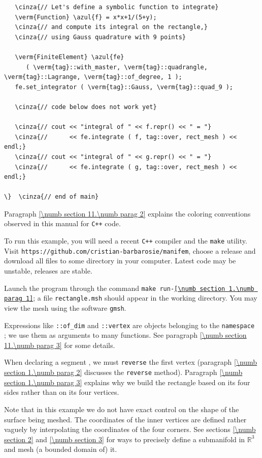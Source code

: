 \begin{Verbatim}
   \cinza{// Let's define a symbolic function to integrate}
   \verm{Function} \azul{f} = x*x+1/(5+y);
   \cinza{// and compute its integral on the rectangle,}
   \cinza{// using Gauss quadrature with 9 points}

   \verm{FiniteElement} \azul{fe}
      ( \verm{tag}::with_master, \verm{tag}::quadrangle, \verm{tag}::Lagrange, \verm{tag}::of_degree, 1 );
   fe.set_integrator ( \verm{tag}::Gauss, \verm{tag}::quad_9 );

   \cinza{// code below does not work yet}

   \cinza{// cout << "integral of " << f.repr() << " = "}
   \cinza{//      << fe.integrate ( f, tag::over, rect_mesh ) << endl;}
   \cinza{// cout << "integral of " << g.repr() << " = "}
   \cinza{//      << fe.integrate ( g, tag::over, rect_mesh ) << endl;}

\}  \cinza{// end of main}
\end{Verbatim}

Paragraph \ref{\numb section 11.\numb parag 2} explains the coloring conventions observed
in this manual for {\tt C++} code.

To run this example, you will need a recent {\tt C++} compiler and the {\tt make} utility.
Visit {\small\tt https://github.com/cristian-barbarosie/manifem}, choose a release
and download all files to some directory in your computer.
Latest code may be unstable, releases are stable.

Launch the program through the command
{\small\tt make run-\ref{\numb section 1.\numb parag 1}};
a file {\small\tt rectangle.msh} should appear in the working directory.
You may view the mesh using the software {\tt gmsh}.

Expressions like {\small\tt {}::of\_dim} and {\small\tt {}::vertex} are
objects belonging to the {\small\tt namespace };
we use them as arguments to many functions.
See paragraph \ref{\numb section 11.\numb parag 3} for some details.

When declaring a segment {\small\tt {}}, we must {\small\tt reverse} the first vertex
(paragraph \ref{\numb section 1.\numb parag 2} discusses the {\small\tt reverse} method).
Paragraph \ref{\numb section 1.\numb parag 3} explains why we build
the rectangle based on its four sides rather than on its four vertices.

Note that in this example we do not have exact control on the shape of the surface being meshed.
The coordinates of the inner vertices are defined rather vaguely by interpolating the
coordinates of the four corners.
See sections \ref{\numb section 2} and \ref{\numb section 3} for ways to precisely define
a submanifold in $ \mathbb{R}^3 $ and mesh (a bounded domain of) it.


